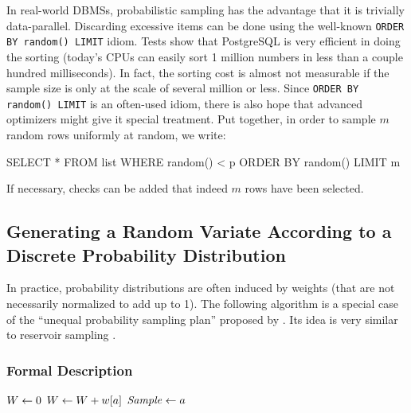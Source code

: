 In real-world DBMSs, probabilistic sampling has the advantage that it is trivially data-parallel. Discarding excessive items can be done using the well-known \texttt{ORDER BY random() LIMIT} idiom. Tests show that PostgreSQL is very efficient in doing the sorting (today's CPUs can easily sort 1 million numbers in less than a couple hundred milliseconds). In fact, the sorting cost is almost not measurable if the sample size is only at the scale of several million or less. Since \texttt{ORDER BY random() LIMIT} is an often-used idiom, there is also hope that advanced optimizers might give it special treatment. Put together, in order to sample $m$ random rows uniformly at random, we write:
\begin{sql}
	SELECT * FROM list WHERE random() < p ORDER BY random() LIMIT m
\end{sql}
If necessary, checks can be added that indeed $m$ rows have been selected.


\subsection{Generating a Random Variate According to a Discrete Probability Distribution}

In practice, probability distributions are often induced by weights (that are not necessarily normalized to add up to 1). The following algorithm is a special case of the ``unequal probability sampling plan'' proposed by \textcite{C82a}. Its idea is very similar to reservoir sampling \cite{MB83a}.

\subsubsection{Formal Description}

\begin{algorithm}[WeightedSample$(A, w)$] \label{alg:WeightedSample}
\begin{algorithmic}[1]
	\State $W \leftarrow 0$
		\State $W \leftarrow W + w[a]$ \label{alg:WeightedSample:UpdateWeight}
		 \label{alg:WeightedSample:Prob}
			\State $\mathit{Sample} \leftarrow a$ \label{alg:WeightedSample:SetSample}
		\EndWith
	\EndFor
\end{algorithmic}
\end{algorithm}

